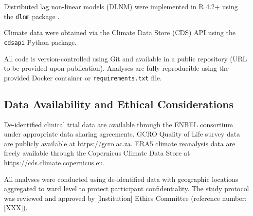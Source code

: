 Distributed lag non-linear models (DLNM) were implemented in R 4.2+ using the \texttt{dlnm} package \citep{gasparrini2010distributed}.

Climate data were obtained via the Climate Data Store (CDS) API using the \texttt{cdsapi} Python package.

All code is version-controlled using Git and available in a public repository (URL to be provided upon publication). Analyses are fully reproducible using the provided Docker container or \texttt{requirements.txt} file.

\subsection{Data Availability and Ethical Considerations}

De-identified clinical trial data are available through the ENBEL consortium under appropriate data sharing agreements. GCRO Quality of Life survey data are publicly available at \url{https://gcro.ac.za}. ERA5 climate reanalysis data are freely available through the Copernicus Climate Data Store at \url{https://cds.climate.copernicus.eu}.

All analyses were conducted using de-identified data with geographic locations aggregated to ward level to protect participant confidentiality. The study protocol was reviewed and approved by [Institution] Ethics Committee (reference number: [XXX]).
